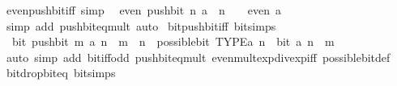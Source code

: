\begin{isabellebody}
%
\isadelimproof
\isanewline
%
\endisadelimproof
\isanewline
{}\isamarkupfalse%
\ even{\isacharunderscore}{\kern0pt}push{\isacharunderscore}{\kern0pt}bit{\isacharunderscore}{\kern0pt}iff\ {\isacharbrackleft}{\kern0pt}simp{\isacharbrackright}{\kern0pt}{\isacharcolon}{\kern0pt}\isanewline
\ \ {\isacartoucheopen}even\ {\isacharparenleft}{\kern0pt}push{\isacharunderscore}{\kern0pt}bit\ n\ a{\isacharparenright}{\kern0pt}\ {\isasymlongleftrightarrow}\ n\ {\isasymnoteq}\ {}\ {\isasymor}\ even\ a{\isacartoucheclose}\isanewline
%
\isadelimproof
\ \ %
\endisadelimproof
%
\isatagproof
{}\isamarkupfalse%
\ {\isacharparenleft}{\kern0pt}simp\ add{\isacharcolon}{\kern0pt}\ push{\isacharunderscore}{\kern0pt}bit{\isacharunderscore}{\kern0pt}eq{\isacharunderscore}{\kern0pt}mult{\isacharparenright}{\kern0pt}\ auto%
\endisatagproof
{\isafoldproof}%
%
\isadelimproof
\isanewline
%
\endisadelimproof
\isanewline
{}\isamarkupfalse%
\ bit{\isacharunderscore}{\kern0pt}push{\isacharunderscore}{\kern0pt}bit{\isacharunderscore}{\kern0pt}iff\ {\isacharbrackleft}{\kern0pt}bit{\isacharunderscore}{\kern0pt}simps{\isacharbrackright}{\kern0pt}{\isacharcolon}{\kern0pt}\isanewline
\ \ {\isacartoucheopen}bit\ {\isacharparenleft}{\kern0pt}push{\isacharunderscore}{\kern0pt}bit\ m\ a{\isacharparenright}{\kern0pt}\ n\ {\isasymlongleftrightarrow}\ m\ {\isasymle}\ n\ {\isasymand}\ possible{\isacharunderscore}{\kern0pt}bit\ TYPE{\isacharparenleft}{\kern0pt}{\isacharprime}{\kern0pt}a{\isacharparenright}{\kern0pt}\ n\ {\isasymand}\ bit\ a\ {\isacharparenleft}{\kern0pt}n\ {\isacharminus}{\kern0pt}\ m{\isacharparenright}{\kern0pt}{\isacartoucheclose}\isanewline
%
\isadelimproof
\ \ %
\endisadelimproof
%
\isatagproof
{}\isamarkupfalse%
\ {\isacharparenleft}{\kern0pt}auto\ simp\ add{\isacharcolon}{\kern0pt}\ bit{\isacharunderscore}{\kern0pt}iff{\isacharunderscore}{\kern0pt}odd\ push{\isacharunderscore}{\kern0pt}bit{\isacharunderscore}{\kern0pt}eq{\isacharunderscore}{\kern0pt}mult\ even{\isacharunderscore}{\kern0pt}mult{\isacharunderscore}{\kern0pt}exp{\isacharunderscore}{\kern0pt}div{\isacharunderscore}{\kern0pt}exp{\isacharunderscore}{\kern0pt}iff\ possible{\isacharunderscore}{\kern0pt}bit{\isacharunderscore}{\kern0pt}def{\isacharparenright}{\kern0pt}%
\endisatagproof
{\isafoldproof}%
%
\isadelimproof
\isanewline
%
\endisadelimproof
\isanewline
{}\isamarkupfalse%
\ bit{\isacharunderscore}{\kern0pt}drop{\isacharunderscore}{\kern0pt}bit{\isacharunderscore}{\kern0pt}eq\ {\isacharbrackleft}{\kern0pt}bit{\isacharunderscore}{\kern0pt}simps{\isacharbrackright}{\kern0pt}{\isacharcolon}{\kern0pt}\isanewline

\end{isabellebody}
